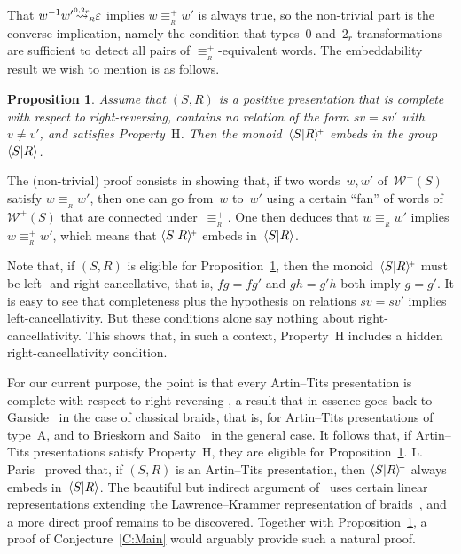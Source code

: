 \documentclass{amsart}
\numberwithin{equation}{section}
\theoremstyle{plain}
\newtheorem{prop}{Proposition}[section]
\theoremstyle{definition}
\begin{document}
That ${w}{^{-1}} {w}' {\overset{{}_{{0,2{_{r}}}}}{\rightsquigarrow}_{\hspace{-0.4ex}{\scriptscriptstyle R}}} {\varepsilon}$ implies ${w} {\equiv_{{\!{}_{R}}}^{\scriptscriptstyle+}} {w}'$ is always true, so the non-trivial part is the converse implication, namely the condition that types~$0$ and~$2{_{r}}$ transformations are sufficient to detect all pairs of ${\equiv_{{\!{}_{R}}}^{\scriptscriptstyle+}}$-equivalent words. The embeddability result we wish to mention is as follows.

\begin{prop}\cite[Proposition~3.29]{Dia}
\label{P:Embed}
Assume that $({S}, {R})$ is a positive presentation that is complete with respect to right-reversing, contains no relation of the form ${s} {v} = {s} {v}'$ with ${v} \not= {v}'$, and satisfies Property~${\mathrm{H}}$. Then the monoid~${\langle{S}{\mid}\nobreak{R}\rangle^{\!\scriptscriptstyle+}}$ embeds in the group~${\langle{S}{\mid}\nobreak{R}\rangle}$.
\end{prop}

The (non-trivial) proof consists in showing that, if two words~${w}, {w}'$ of~${\mathcal{W}^{\scriptscriptstyle+}\!({S})}$ satisfy ${w} {\equiv_{{\!{}_{R}}}} {w}'$, then one can go from~${w}$ to~${w}'$ using a certain ``fan'' of words of~${\mathcal{W}^{\scriptscriptstyle+}\!({S})}$ that are connected under~${\equiv_{{\!{}_{R}}}^{\scriptscriptstyle+}}$. One then deduces that ${w} {\equiv_{{\!{}_{R}}}} {w}'$ implies ${w} {\equiv_{{\!{}_{R}}}^{\scriptscriptstyle+}} {w}'$, which means that ${\langle{S}{\mid}\nobreak{R}\rangle^{\!\scriptscriptstyle+}}$ embeds in~${\langle{S}{\mid}\nobreak{R}\rangle}$.

Note that, if $({S}, {R})$ is eligible for Proposition~\ref{P:Embed}, then the monoid~${\langle{S}{\mid}\nobreak{R}\rangle^{\!\scriptscriptstyle+}}$ must be left- and right-cancellative, that is, ${f} {g} = {f} {g}'$ and ${g} {h} = {g}' {h}$ both imply ${g} = {g}'$. It is easy to see that completeness plus the hypothesis on relations ${s} {v} = {s} {v}'$ implies left-cancellativity. But these conditions alone say nothing about right-cancellativity. This shows that, in such a context, Property~${\mathrm{H}}$ includes a hidden right-cancellativity condition.

For our current purpose, the point is that every Artin--Tits presentation is complete with respect to right-reversing \cite{Dgp}, a result  that in essence goes back to Garside~\cite{Gar} in the case of classical braids, that is, for Artin--Tits presentations of type~A, and to Brieskorn and Saito~\cite{BrS} in the general case. It follows that, if Artin--Tits presentations satisfy Property~${\mathrm{H}}$, they are eligible for Proposition~\ref{P:Embed}. L.\,Paris~\cite{Par} proved that, if $({S}, {R})$ is an Artin--Tits presentation, then ${\langle{S}{\mid}\nobreak{R}\rangle^{\!\scriptscriptstyle+}}$ always embeds in~${\langle{S}{\mid}\nobreak{R}\rangle}$. The beautiful but indirect argument of~\cite{Par} uses certain linear representations extending the Lawrence--Krammer representation of braids~\cite{Krb}, and a more direct proof remains to be discovered. Together with Proposition~\ref{P:Embed}, a proof of Conjecture~\ref{C:Main} would arguably provide such a natural proof.
\end{document}
